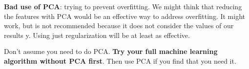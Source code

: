 \textbf{Bad use of PCA}:
trying to prevent overfitting. We might think that reducing the features with PCA would be an effective way to address overfitting. It might work, but is not recommended because it does not consider the values of our results y. Using just regularization will be at least as effective.

Don't assume you need to do PCA. \textbf{Try your full machine learning algorithm without PCA first}. Then use PCA if you find that you need it.
